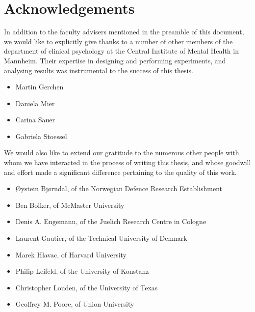 \chapter{Acknowledgements}
    In addition to the faculty advisers mentioned in the preamble of this document, we would like to explicitly give thanks to a number of other members of the department of clinical psychology at the Central Institute of Mental Health in Mannheim.
    Their expertise in designing and performing experiments, and analysing results was instrumental to the success of this thesis.
    \begin{multicols}{2}
	\begin{itemize}
	    \item Martin Gerchen
	    \item Daniela Mier
	    \item Carina Sauer
	    \item Gabriela Stoessel
	\end{itemize}
    \end{multicols}
    \vspace{0.5cm}
    We would also like to extend our gratitude to the numerous other people with whom we have interacted in the process of writing this thesis, and whose goodwill and effort made a significant difference pertaining to the quality of this work.
    \begin{itemize}
	\item Øystein Bjørndal, of the Norwegian Defence Research Establishment
	\item Ben Bolker, of McMaster University
        \item Denis A. Engemann, of the Juelich Research Centre in Cologne
	\item Laurent Gautier, of the Technical University of Denmark
	\item Marek Hlavac, of Harvard University
	\item Philip Leifeld, of the University of Konstanz
	\item Christopher Louden, of the University of Texas
	\item Geoffrey M. Poore, of Union University
    \end{itemize}

